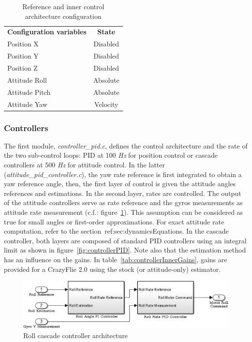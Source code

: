 \documentclass[a4paper, 12pt]{report}
\begin{document}
\begin{table}[htbp]
\centering
\caption{Reference and inner control architecture configuration}
\begin{tabular}{|l|c|}
\hline
\textbf{Configuration variables} & \textbf{State}  \\
\hhline{|=|=|}
Position X & Disabled \\
\hline
Position Y & Disabled \\
\hline
Position Z & Disabled \\
\hline
Attitude Roll & Absolute\\
\hline
Attitude Pitch & Absolute\\
\hline
Attitude Yaw & Velocity\\
\hline
\end{tabular}
\label{tab:setpointConfig}
\end{table}

\subsubsection{Controllers}
The first module, \emph{controller\_pid.c}, defines the control architecture and the rate of the two sub-control loops: PID at 100 \emph{Hz} for position control or cascade controllers at 500 \emph{Hz} for attitude control. In the latter (\emph{attitude\_pid\_controller.c}), the yaw rate reference is first integrated to obtain a yaw reference angle, then, the first layer of control is given the attitude angles references and estimations. In the second layer, rates are controlled. The output of the attitude controllers serve as rate reference and the gyros measurements as attitude rate measurement (c.f.: figure~\ref{fig:controllerCascade}). This assumption can be considered as true for small angles or first-order approximations. For exact attitude rate computation, refer to the section~ref:{sec:dynamicsEquations}.  In the cascade controller, both layers  are composed of standard PID controllers using an integral limit as shown in figure~\ref{fig:controllerPID}. Note also that the estimation method has an influence on the gains. In table~\ref{tab:controllerInnerGains}, gains are provided for a CrazyFlie 2.0 using the stock (or attitude-only) estimator.

\begin{figure}[htbp]
\centering
\includegraphics[scale = 0.75]{Images/controllerCascade}
\caption{Roll cascade controller architecture}
\label{fig:controllerCascade}
\end{figure}
\end{document}

